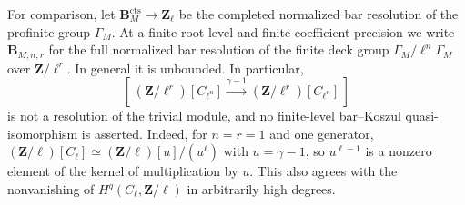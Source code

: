 \documentclass[11pt]{article}
\theoremstyle{definition}
\theoremstyle{remark}
\begin{document}
For comparison, let $\mathbf B_M^{\mathrm{cts}}\to\mathbf Z_\ell$ be the
completed normalized bar resolution of the profinite group $\Gamma_M$.  At a
finite root level and finite coefficient precision we write
$\mathbf B_{M;n,r}$ for the full normalized bar resolution of the finite deck
group $\Gamma_M/\ell^n\Gamma_M$ over $\mathbf Z/\ell^r$.  In general it is
unbounded.  In particular,
\[
 [\,(\mathbf Z/\ell^r)[C_{\ell^n}]
   \xrightarrow{\gamma-1}(\mathbf Z/\ell^r)[C_{\ell^n}]\,]
\]
is not a resolution of the trivial module, and no finite-level
bar--Koszul quasi-isomorphism is asserted.
Indeed, for $n=r=1$ and one generator,
\((\mathbf Z/\ell)[C_\ell]\simeq
(\mathbf Z/\ell)[u]/(u^\ell)\) with $u=\gamma-1$, so
$u^{\ell-1}$ is a nonzero element of the kernel of multiplication by $u$.
This also agrees with the nonvanishing of
$H^q(C_\ell,\mathbf Z/\ell)$ in arbitrarily high degrees.
\end{document}
